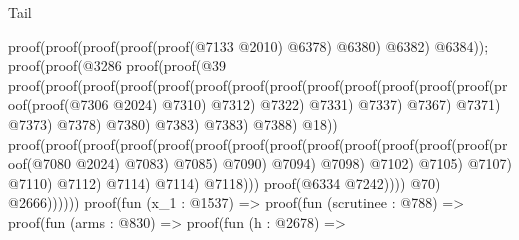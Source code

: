 \begin{lexlean}{Tail}
\begin{coremodule}
                              proof(proof(proof(proof(proof(@7133 @2010) @6378) @6380) @6382)
                                  @6384));
                            proof(proof(@3286
                                  proof(proof(@39
                                        proof(proof(proof(proof(proof(proof(proof(proof(proof(proof(proof(proof(proof(proof(proof(@7306
                                                                        @2024)
                                                                      @7310)
                                                                    @7312)
                                                                  @7322)
                                                                @7331)
                                                              @7337)
                                                            @7367)
                                                          @7371)
                                                        @7373)
                                                      @7378)
                                                    @7380)
                                                  @7383)
                                                @7383)
                                              @7388)
                                            @18))
                                      proof(proof(proof(proof(proof(proof(proof(proof(proof(proof(proof(proof(proof(proof(@7080
                                                                    @2024)
                                                                  @7083)
                                                                @7085)
                                                              @7090)
                                                            @7094)
                                                          @7098)
                                                        @7102)
                                                      @7105)
                                                    @7107)
                                                  @7110)
                                                @7112)
                                              @7114)
                                            @7114)
                                          @7118)))
                                proof(@6334 @7242))))
                        @70)
                      @2666))))))
        proof(fun (x_1 : @1537) =>
          proof(fun (scrutinee : @788) =>
            proof(fun (arms : @830) =>
              proof(fun (h : @2678) =>

\end{coremodule}
\end{lexlean}
